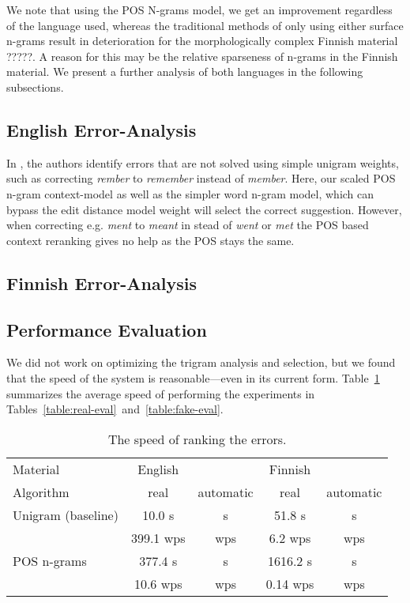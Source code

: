 \documentclass{llncs}
\begin{document}
We note that using the POS N-grams model, we get an improvement regardless of
the language used, whereas the traditional methods of only using either surface
n-grams result in deterioration for the morphologically complex Finnish
material ?????. A reason for this may be the relative sparseness of n-grams in
the Finnish material. We present a further analysis of both languages in the
following subsections.

\subsection{English Error-Analysis}

In \cite{norvig/2010}, the authors identify errors that are not solved using
simple unigram weights, such as correcting \emph{rember} to \emph{remember}
instead of \emph{member}. Here, our scaled POS n-gram context-model as well
as the simpler word n-gram model, which can bypass the
edit distance model weight will select the correct suggestion. However, when
correcting e.g.  \emph{ment} to \emph{meant} in stead of \emph{went} or
\emph{met} the POS based context reranking gives no help as the POS stays the
same.
 
\subsection{Finnish Error-Analysis}

\subsection{Performance Evaluation}

We did not work on optimizing the trigram analysis and selection,
but we found that the speed of the system is reasonable---even in its current
form. Table~\ref{table:speed-eval} summarizes the average
speed of performing the experiments in Tables~\ref{table:real-eval}~and~\ref{table:fake-eval}.

\begin{table}
    \caption{The speed of ranking the errors.
    \label{table:speed-eval}}
  \begin{center}
      \begin{tabular}{lcccc}
        \hline
        Material  & English &  & Finnish &  \\
        Algorithm & real    &  automatic         & real    &  automatic         \\
        \hline
        Unigram (baseline)   &    10.0 s &      s & 51.8 s &     s  \\
         & 399.1 wps &    wps & 6.2 wps &   wps  \\
        \hline
        POS n-grams   &   377.4 s &     s & 1616.2 s &     s  \\
          & 10.6  wps &   wps & 0.14 wps &   wps  \\
        \hline
      \end{tabular}
  \end{center}
\end{table}
\end{document}
